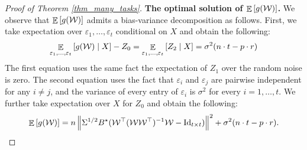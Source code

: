 \begin{proof}[Proof of Theorem \ref{thm_many_tasks}]
	\medskip
	\noindent\textbf{The optimal solution of $\mathop{\mathbb{E}}\left[ g({\mathcal W}) \right]$.}
	We observe that $\mathop{\mathbb{E}}\left[ g({\mathcal W}) \right]$ admits a bias-variance decomposition as follows.
	First, we take expectation over $\varepsilon_1, \dots, \varepsilon_t$ conditional on $X$ and obtain the following:
	\begin{align}
		\mathop{\mathbb{E}}_{\varepsilon_1, \dots, \varepsilon_t}\left[ g({\mathcal W}) \mid X \right] - Z_0
		= \mathop{\mathbb{E}}_{\varepsilon_1, \dots, \varepsilon_t}\left[ Z_2 \mid X \right]
		= \sigma^2(n\cdot t - p\cdot r) \nonumber
	\end{align}
	The first equation uses the same fact the expectation of $Z_1$ over the random noise is zero.
	The second equation uses the fact that $\varepsilon_i$ and $\varepsilon_j$ are pairwise independent for any $i \neq j$, and the variance of every entry of $\varepsilon_i$ is $\sigma^2$ for every $i = 1,\dots, t$.
	We further take expectation over $X$ for $Z_0$ and obtain the following:
	\begin{align*}
		\ex{g(\cW)} = n \bignorm{\Sigma^{1/2} B^{\star} (\cW^{\top} (\cW \cW^{\top})^{-1} \cW - \id_{t\times t})}^2 + \sigma^2 (n\cdot t - p \cdot r).

\end{align*}
\end{proof}
